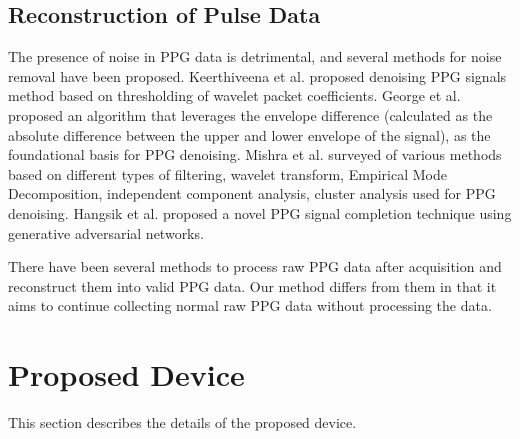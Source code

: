 \documentclass[sigconf]{acmart}
\begin{document}
\subsection{Reconstruction of Pulse Data}
The presence of noise in PPG data is detrimental, and several methods for noise removal have been proposed.
Keerthiveena et al.\cite{pulse_data_denoise_keerthiveena} proposed denoising PPG signals method based on thresholding of wavelet packet coefficients.
George et al.\cite{pulse_data_denoise_george} proposed an algorithm that leverages the envelope difference (calculated as the absolute difference between the upper and lower envelope of the signal), as the foundational basis for PPG denoising.
Mishra et al.\cite{pulse_data_denoise_mishra} surveyed of various methods based on different types of filtering, wavelet transform, Empirical Mode Decomposition, independent component analysis, cluster analysis used for PPG denoising.
Hangsik et al.\cite{pulse_data_completion_hangsik} proposed a novel PPG signal completion technique using generative adversarial networks.\par

There have been several methods to process raw PPG data after acquisition and reconstruct them into valid PPG data. Our method differs from them in that it aims to continue collecting normal raw PPG data without processing the data.



\section{Proposed Device}
\label{sec:device}
This section describes the details of the proposed device.
\end{document}
